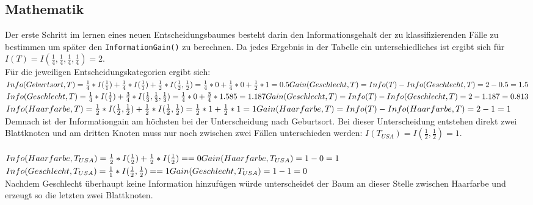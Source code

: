 \documentclass[a4paper]{article}
\begin{document}
\subsection{Mathematik}
Der erste Schritt im lernen eines neuen Entscheidungsbaumes besteht darin den Informationsgehalt der zu klassifizierenden Fälle zu bestimmen um später den \texttt{InformationGain()} zu berechnen. Da jedes Ergebnis in der Tabelle ein unterschiedliches ist ergibt sich für
$I(T)= I(\frac 1 4,\frac 1 4,\frac 1 4,\frac 1 4) = 2$.\\
Für die jeweiligen Entscheidungskategorien ergibt sich:\\
$Info(Geburtsort,T)=\frac 1 4 * I(\frac{1}{1}) + \frac 1 4 *I(\frac{1}{1})+ \frac 1 2 * I(\frac 1 2 , \frac 1 2 ) = 
\frac 1 4 * 0 + \frac 1 4 *0+ \frac 1 2 * 1
=0.5 \\
Gain(Geschlecht,T)=Info(T)-Info(Geschlecht,T)=2-0.5=1.5\\
$
\\
$Info(Geschlecht,T)=\frac 1 4 * I(\frac{1}{1}) + \frac 3 4 * I(\frac 1 3 , \frac 1 3 ,\frac 1 3) = 
\frac 1 4 * 0 +  \frac 3 4 * 1.585
=1.187\\
Gain(Geschlecht,T)=Info(T)-Info(Geschlecht,T)=2-1.187=0.813\\
$
\\
$Info(Haarfarbe,T)=\frac 1 2 * I(\frac{1}{2},\frac{1}{2}) + \frac 1 2 * I(\frac 1 2 , \frac 1 2 ) = 
\frac 1 2 * 1 +  \frac 1 2 * 1
=1\\
Gain(Haarfarbe,T)=Info(T)-Info(Haarfarbe,T)=2-1=1\\
$
Demnach ist der Informationgain am höchsten bei der Unterscheidung nach Geburtsort. Bei dieser Unterscheidung entstehen direkt zwei Blattknoten und am dritten Knoten muss nur noch zwischen zwei Fällen unterschieden werden:
$I(T_{USA})= I(\frac 1 2,\frac 1 2) = 1$.\\
\\
$
Info(Haarfarbe,T_{USA})=\frac 1 2 * I(\frac{1}{2}) + \frac 1 2 * I( \frac 1 2 ) = 
=0\\
Gain(Haarfarbe,T_{USA})=1-0=1
$
\\
$Info(Geschlecht,T_{USA})=\frac 1 1 * I(\frac{1}{2},\frac{1}{2}) = 
=1\\
Gain(Geschlecht,T_{USA})=1-1=0
$
\\
Nachdem Geschlecht überhaupt keine Information hinzufügen würde unterscheidet der Baum an dieser Stelle zwischen Haarfarbe und erzeugt so die letzten zwei Blattknoten.
\end{document}
